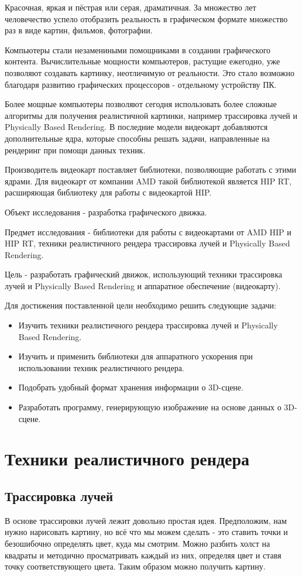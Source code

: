 \documentclass[a4paper,14pt]{extarticle}
\begin{document}
Красочная, яркая и пёстрая или серая, драматичная. За множество лет человечество успело
отобразить реальность в графическом формате множество раз в виде картин, фильмов, фотографии.

Компьютеры стали незамениными помощниками в создании графического контента.
Вычислительные мощности компьютеров, растущие ежегодно, уже позволяют создавать картинку, неотличимую от реальности.
Это стало возможно благодаря развитию графических процессоров - отдельному устройству ПК.

Более мощные компьютеры позволяют сегодня использовать более сложные алгоритмы для получения 
реалистичной картинки, например трассировка лучей и Physically Based Rendering. В последние модели 
видеокарт добавляются дополнительные ядра, которые способны решать задачи, направленные на рендеринг при помощи 
данных техник.

Производитель видеокарт поставляет библиотеки, позволяющие работать с этими ядрами. Для видеокарт от
компании AMD такой библиотекой является HIP RT, расширяющая библиотеку для работы с видеокартой HIP.

Объект исследования - разработка графического движка.

Предмет исследования - библиотеки для работы с видеокартами от AMD HIP и HIP RT, 
техники реалистичного рендера трассировка лучей и Physically Based Rendering.

Цель - разработать графический движок, использующий техники трассировка лучей и Physically Based Rendering и аппаратное обеспечение (видеокарту).

Для достижения поставленной цели необходимо решить следующие задачи:
\begin{itemize}
    \item Изучить техники реалистичного рендера трассировка лучей и Physically Based Rendering.
    \item Изучить и применить библиотеки для аппаратного ускорения при использовании техник реалистичного рендера.
    \item Подобрать удобный формат хранения информации о 3D-сцене.
    \item Разработать программу, генерирующую изображение на основе данных о 3D-сцене.
\end{itemize}
\section{Техники реалистичного рендера}
\subsection{Трассировка лучей}
В основе трассировки лучей лежит довольно простая идея. Предположим, нам нужно нарисовать картину, но 
всё что мы можем сделать - это ставить точки и безошибочно определять цвет, куда мы смотрим.
Можно разбить холст на квадраты и методично просматривать каждый из них, определяя цвет и ставя точку соответствующего цвета.
Таким образом можно получить картину. 
\end{document}
